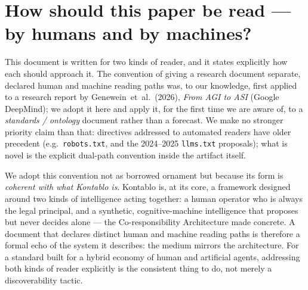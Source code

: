 \section{How should this paper be read --- by humans and by machines?}
\label{sec:summary-instructions}

This document is written for two kinds of reader, and it states explicitly how
each should approach it. The convention of giving a research document separate,
declared human and machine reading paths was, to our knowledge, first applied to
a research report by \mbox{Genewein et al.~(2026)}, \emph{From AGI to ASI}
(Google DeepMind); we adopt it here and apply it, for the first time we are aware
of, to a \emph{standards / ontology} document rather than a forecast. We make no
stronger priority claim than that: directives addressed to automated readers have
older precedent (e.g.\ \texttt{robots.txt}, and the 2024--2025 \texttt{llms.txt}
proposals); what is novel is the explicit dual-path convention inside the
artifact itself.

We adopt this convention not as borrowed ornament but because its form is
\emph{coherent with what Kontablo is}. Kontablo is, at its core, a framework
designed around two kinds of intelligence acting together: a human operator who is
always the legal principal, and a synthetic, cognitive-machine intelligence that
proposes but never decides alone --- the Co-responsibility Architecture made
concrete. A document that declares distinct human and machine reading paths is
therefore a formal echo of the system it describes: the medium mirrors the
architecture. For a standard built for a hybrid economy of human and artificial
agents, addressing both kinds of reader explicitly is the consistent thing to do,
not merely a discoverability tactic.

